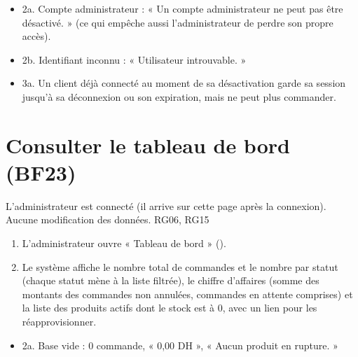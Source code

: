 \begin{itemize}
  \item 2a. Compte administrateur : « Un compte administrateur ne peut pas être désactivé. » (ce qui empêche aussi
        l'administrateur de perdre son propre accès).
  \item 2b. Identifiant inconnu : « Utilisateur introuvable. »
  \item 3a. Un client déjà connecté au moment de sa désactivation garde sa session jusqu'à sa déconnexion ou son
        expiration, mais ne peut plus commander.
\end{itemize}

\section{Consulter le tableau de bord (BF23)}

  {L'administrateur est connecté (il arrive sur cette page après la connexion).}
  {Aucune modification des données.}
  {RG06, RG15}

\begin{enumerate}
  \item L'administrateur ouvre « Tableau de bord » ().
  \item Le système affiche le nombre total de commandes et le nombre par statut (chaque statut mène à la liste
        filtrée), le chiffre d'affaires (somme des montants des commandes non annulées, commandes en attente
        comprises) et la liste des produits actifs dont le stock est à 0, avec un lien pour les réapprovisionner.
\end{enumerate}

\begin{itemize}
  \item 2a. Base vide : 0 commande, « 0,00 DH », « Aucun produit en rupture. »
\end{itemize}
